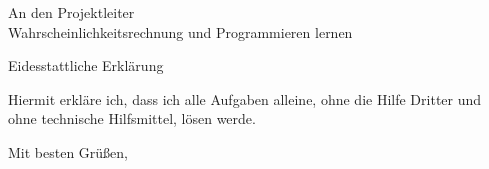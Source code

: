 \documentclass{letter}
\begin{document}
 \begin{letter}{An den Projektleiter \\ \glqq Wahrscheinlichkeitsrechnung und Programmieren lernen\grqq}
  \opening{Eidesstattliche Erklärung}
   Hiermit erkläre ich, dass ich alle Aufgaben alleine, ohne die Hilfe Dritter
   und ohne technische Hilfsmittel, lösen werde.
  \closing{Mit besten Grüßen,}
 \end{letter}
\end{document}
